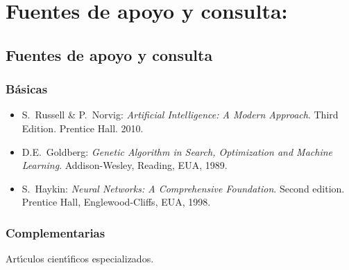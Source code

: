 \section{Fuentes de apoyo y consulta:}
\subsection{Fuentes de apoyo y consulta}
\subsubsection{B\'{a}sicas}

\begin{itemize}[itemsep=0em]
  
\item{S.\ {\sc Russell} \& P.\ {\sc Norvig}: {\em Artificial
    Intelligence: A Modern Approach}. Third Edition. Prentice
  Hall. 2010.}

\item{D.E.\ {\sc Goldberg}: {\em Genetic Algorithm in Search,
    Optimization and Machine Learning}. Addison-Wesley, Reading, EUA,
  1989.}

\item{S.\ {\sc Haykin}: {\em Neural Networks: A Comprehensive
    Foundation}. Second edition. Prentice Hall, Englewood-Cliffs, EUA,
  1998.}

\end{itemize}

\subsubsection{Complementarias}

\quad

Art\'{\i}culos cient\'{\i}ficos especializados.
